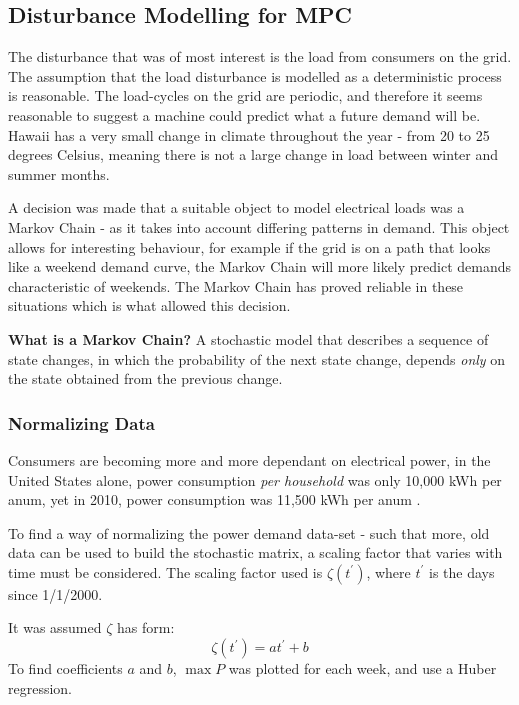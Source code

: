 \subsection{Disturbance Modelling for MPC}
\label{sec:markov}

The disturbance that was of most interest is the load from consumers on the grid.
The assumption that the load disturbance is modelled as a deterministic process is reasonable. 
The load-cycles on the grid are periodic, and therefore it seems reasonable to suggest a machine could predict what a future demand will be.
Hawaii has a very small change in climate throughout the year - from 20 to 25 degrees Celsius, meaning there is not a large change in load between winter and summer months.

A decision was made that a suitable object to model electrical loads was a Markov Chain - as it takes into account differing patterns in demand.
This object allows for interesting behaviour, for example if the grid is on a path that looks like a weekend demand curve, the Markov Chain will more likely predict demands characteristic of weekends.
The Markov Chain has proved reliable in these situations \cite{power:markovP} which is what allowed this decision.

\textbf{What is a Markov Chain?}
A stochastic model that describes a sequence of state changes, in which the probability of the next state change, depends \emph{only} on the state obtained from the previous change.

\subsubsection{Normalizing Data}

Consumers are becoming more and more dependant on electrical power, in the United States alone, power consumption \emph{per household} was only 10,000 kWh per anum, yet in 2010, power consumption was 11,500 kWh per anum \cite{power:growth}.

To find a way of normalizing the power demand data-set - such that more, old data can be used to build the stochastic matrix, a scaling factor that varies with time must be considered.
The scaling factor used is $\zeta(t^{\prime})$, where $t^{\prime}$ is the days since 1/1/2000.

It was assumed $\zeta$ has form:
\begin{equation}
        \zeta(t^{\prime}) = a t^{\prime} + b
\end{equation}
To find coefficients $a$ and $b$, $\max P$ was plotted for each week, and use a Huber regression.

